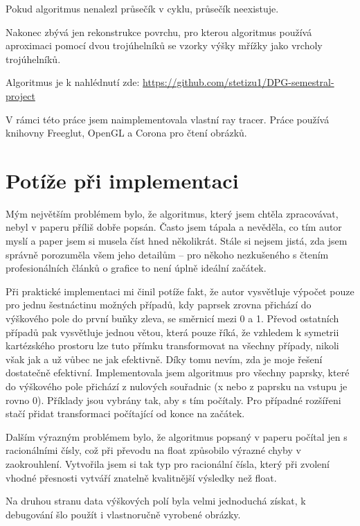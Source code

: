 \documentclass[report,11pt]{elsarticle}
\begin{document}
Pokud algoritmus nenalezl průsečík v cyklu, průsečík neexistuje.

 
 Nakonec zbývá jen rekonstrukce povrchu, pro kterou algoritmus používá aproximaci pomocí dvou trojúhelníků se vzorky výšky mřížky jako vrcholy trojúhelníků.


Algoritmus je k nahlédnutí zde: \url{https://github.com/stetizu1/DPG-semestral-project}

V rámci této práce jsem naimplementovala vlastní ray tracer. Práce používá knihovny Freeglut, OpenGL a Corona pro čtení obrázků.

\section{\label{SEC:Pitfalls}Potíže při implementaci}

Mým největším problémem bylo, že algoritmus, který jsem chtěla zpracovávat, nebyl v paperu příliš dobře popsán. Často jsem tápala a nevěděla, co tím autor myslí a paper jsem si musela číst hned několikrát. Stále si nejsem jistá, zda jsem správně porozuměla všem jeho detailům -- pro někoho nezkušeného s čtením profesionálních článků o grafice to není úplně ideální začátek.

Při praktické implementaci mi činil potíže fakt, že autor vysvětluje výpočet pouze pro jednu šestnáctinu možných případů, kdy paprsek zrovna přichází do výškového pole do první buňky zleva, se směrnicí mezi 0 a 1. Převod ostatních případů pak vysvětluje jednou větou, která pouze říká, že vzhledem k symetrii kartézského prostoru lze tuto přímku transformovat na všechny případy, nikoli však jak a už vůbec ne jak efektivně. Díky tomu nevím, zda je moje řešení dostatečně efektivní. Implementovala jsem algoritmus pro všechny paprsky, které do výškového pole přichází z nulových souřadnic (x nebo z paprsku na vstupu je rovno 0). Příklady jsou vybrány tak, aby s tím počítaly. Pro případné rozšířeni stačí přidat transformaci počítající od konce na začátek.

Dalším výrazným problémem bylo, že algoritmus popsaný v paperu počítal jen s racionálními čísly, což při převodu na float způsobilo výrazné chyby v zaokrouhlení. Vytvořila jsem si tak typ pro racionální čísla, který při zvolení vhodné přesnosti vytváří znatelně kvalitnější výsledky než float.

Na druhou stranu data výškových polí byla velmi jednoduchá získat, k debugování šlo použít i vlastnoručně vyrobené obrázky.
\end{document}
